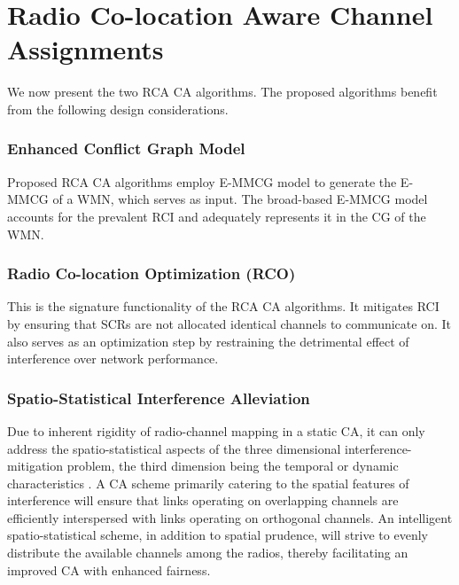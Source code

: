 \documentclass[conference]{IEEEtran}
\begin{document}
\section{Radio Co-location Aware Channel Assignments}
We now present the two RCA CA algorithms. The proposed algorithms benefit from the following design considerations.
\subsubsection{Enhanced Conflict Graph Model}
Proposed RCA CA algorithms employ E-MMCG model \cite{Manas} to generate the E-MMCG of a WMN, which serves as input. The broad-based E-MMCG model accounts for the prevalent RCI and adequately represents it in the CG of the WMN.
\subsubsection{Radio Co-location Optimization (RCO)}
This is the signature functionality of the RCA CA algorithms. It mitigates RCI by ensuring that SCRs are not allocated identical channels to communicate on. It also serves as an optimization step by restraining the detrimental effect of interference over network performance.
\subsubsection{Spatio-Statistical Interference Alleviation}
 Due to inherent rigidity of radio-channel mapping in a static CA, it can only address the spatio-statistical aspects of the three dimensional interference-mitigation problem, the third dimension being the temporal or dynamic characteristics \cite{Manas3}. A CA scheme primarily catering to the spatial features of interference will ensure that links operating on overlapping channels are efficiently interspersed with links operating on orthogonal channels. An intelligent spatio-statistical scheme, in addition to spatial prudence, will strive to evenly distribute the available channels among the radios, thereby facilitating an improved CA with enhanced fairness.
\end{document}
